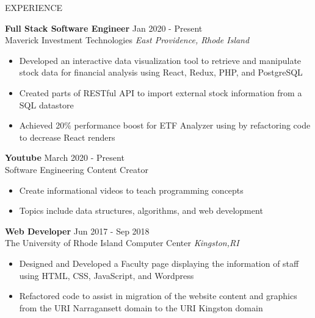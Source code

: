 \begin{rSection}{EXPERIENCE}

	\textbf{Full Stack Software Engineer} \hfill Jan 2020 - Present\\
	Maverick Investment Technologies \hfill \textit{East Providence, Rhode Island}
	 \begin{itemize}
			     \itemsep -3pt {} 
				         \item Developed an interactive data visualization tool to retrieve and manipulate stock data for financial analysis using React, Redux, PHP, and PostgreSQL
						     
						     \item Created parts of RESTful API to import external stock information from a SQL datastore 
							          \item Achieved 20\% performance boost for ETF Analyzer using by refactoring code to decrease React renders
									   \end{itemize}
									    
									    \textbf{Youtube} \hfill  March 2020 - Present\\
									    Software Engineering Content Creator \hfill 
									     \begin{itemize}
											         \itemsep -3pt {} 
													      \item Create informational videos to teach programming concepts
														           \item Topics include data structures, algorithms, and web development
																    \end{itemize}
																     
																      \textbf{Web Developer} \hfill  Jun 2017 - Sep 2018\\
																      The University of Rhode Island Computer Center \hfill \textit{Kingston,RI}
																       \begin{itemize}
																		           \itemsep -3pt {} 
																				        \item Designed and Developed a Faculty page displaying the information of staff using HTML, CSS, JavaScript, and Wordpress
																						     \item Refactored code to assist in migration of the website content and graphics from the URI Narragansett domain to the URI Kingston domain 

																							         
																							      \end{itemize}

\end{rSection} 

